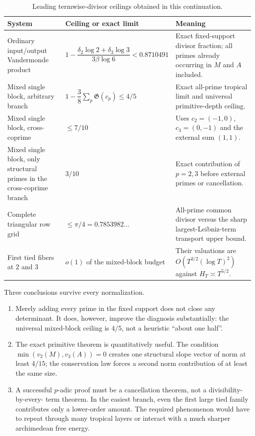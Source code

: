 \documentclass[11pt,oneside]{article}
\theoremstyle{definition}
\theoremstyle{remark}
\begin{document}
\begin{table}[htbp]
\centering
\caption{Leading termwise-divisor ceilings obtained in this continuation.}
\label{tab:ceilings}
\begin{tabularx}{\textwidth}{@{}>{\raggedright\arraybackslash}p{}
 >{\raggedright\arraybackslash}p{}
 >{\raggedright\arraybackslash}X@{}}
\toprule
System & Ceiling or exact limit & Meaning \\
\midrule
Ordinary input/output Vandermonde product &
$1-\dfrac{\delta_2\log2+\delta_3\log3}{3\beta\log6}
 <0.8710491$ &
Exact fixed-support divisor fraction; all primes already occurring in $M$ and $A$ included.\\[0.7em]
Mixed single block, arbitrary branch &
$1-\dfrac38\sum_p\mathfrak G(c_p)\le4/5$ &
Exact all-prime tropical limit and universal primitive-depth ceiling.\\[0.7em]
Mixed single block, cross-coprime &
$\le7/10$ &
Uses $c_2=(-1,0)$, $c_3=(0,-1)$ and the external sum $(1,1)$.\\[0.7em]
Mixed single block, only structural primes in the cross-coprime branch &
$3/10$ &
Exact contribution of $p=2,3$ before external primes or cancellation.\\[0.7em]
Complete triangular row grid &
$\le\pi/4=0.7853982\ldots$ &
All-prime common divisor versus the sharp largest-Leibniz-term transport upper bound.\\[0.7em]
First tied fibers at $2$ and $3$ &
$o(1)$ of the mixed-block budget &
Their valuations are $O(T^{3/2}(\log T)^2)$ against $H_T\asymp T^{5/2}$.\\
\bottomrule
\end{tabularx}
\end{table}

Three conclusions survive every normalization.

\begin{enumerate}
\item Merely adding every prime in the fixed support does not close any determinant.  It does,
      however, improve the diagnosis substantially: the universal mixed-block ceiling is
      $4/5$, not a heuristic ``about one half''.
\item The exact primitive theorem is quantitatively useful.  The condition
      $\min(v_2(M),v_3(A))=0$ creates one structural slope vector of norm at least $4/15$; the
      conservation law forces a second norm contribution of at least the same size.
\item A successful $p$-adic proof must be a cancellation theorem, not a divisibility-by-every-
      term theorem.  In the easiest branch, even the first large tied family contributes only
      a lower-order amount.  The required phenomenon would have to repeat through many
      tropical layers or interact with a much sharper archimedean free energy.
\end{enumerate}
\end{document}
